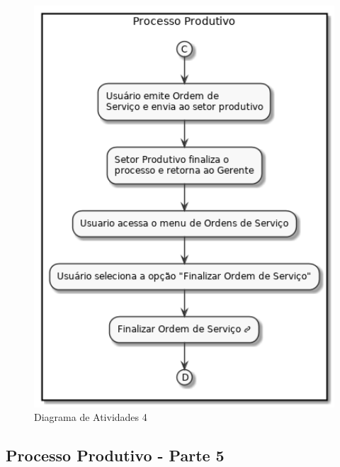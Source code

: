 \documentclass[rascunho,xindy,acronym,symbols]{fei}
\begin{document}
\begin{figure}[H]
    \centering
    \includegraphics[scale=0.6, width=400pt]{./Images/DA_Processo_Produtivo4.png}
    \caption{Diagrama de Atividades 4}
    \label{fig:diag_atv4}
\end{figure}

\subsection{Processo Produtivo - Parte 5}
\end{document}
